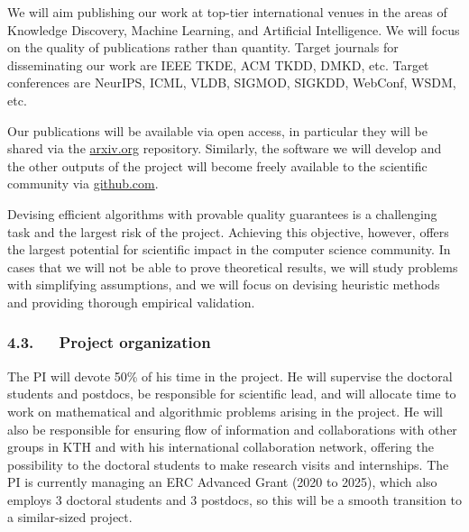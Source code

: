 \documentclass[a4paper,11pt]{article}
\begin{document}
We will aim publishing our work at top-tier international venues
in the areas of Knowledge Discovery, Machine Learning, and Artificial Intelligence.
We will focus on the quality of publications rather than quantity.
Target journals for disseminating our work are IEEE TKDE, ACM TKDD, DMKD, etc. 
Target conferences are NeurIPS, ICML, VLDB, SIGMOD, SIGKDD, WebConf, WSDM, etc.

Our publications will be available via open access, 
in particular they will be shared via the {\small\url{arxiv.org}} repository. 
Similarly, the software we will develop and the other outputs of the project 
will become freely available to the scientific community via {\small\url{github.com}}.

Devising efficient algorithms with provable quality guarantees is a challenging task
and the largest risk of the project. 
Achieving this objective, however, offers the largest potential for scientific impact in the computer science community. 
In cases that we will not be able to prove theoretical results, 
we will study problems with simplifying assumptions, and 
we will focus on devising heuristic methods and providing thorough empirical validation.

\subsubsection*{4.3.~~~Project organization}


The PI will devote 50\% of his time in the project. 
He will supervise the doctoral students and postdocs, 
be responsible for scientific lead, 
and will allocate time to work on mathematical and algorithmic problems arising in the project.
He will also be responsible for ensuring flow of information and collaborations
with other groups in KTH and with his international collaboration network, 
offering the possibility to the doctoral students to make research visits and internships.
The PI is currently managing an ERC Advanced Grant (2020 to 2025),
which also employs 3 doctoral students and 3 postdocs, 
so this will be a smooth transition to a similar-sized project.
\end{document}

